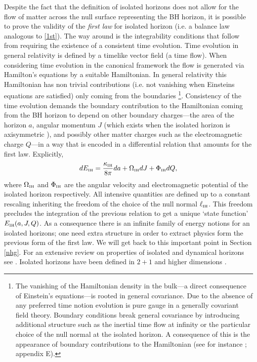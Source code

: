 \documentclass[aps, nofootinbib,superscriptaddress,12pt]{revtex4-2}
\newcommand{\va}{\scriptscriptstyle}
\def\be{\begin{equation}}
\def\ee{\end{equation}}
\begin{document}
Despite the fact that the definition of isolated horizons does not allow for the flow of matter across the null surface representing the BH horizon, it is possible to prove the validity of the {\em first law} for isolated horizon (i.e. a balance law analogous to \eqref{1st}).  The way around is the integrability conditions that follow from requiring the existence of a consistent time evolution.  Time evolution in general relativity is defined by a timelike vector field (a time flow). When considering time evolution in the canonical framework the flow is generated via Hamilton's equations by a suitable Hamiltonian. In general relativity this Hamiltonian has non trivial contributions (i.e. not vanishing when Einsteins equations are satisfied) only coming from the boundaries \footnote{The vanishing of the Hamiltonian density in the bulk---a direct consequence of Einstein's equations---is rooted in general covariance. Due to the absence of any preferred time notion evolution is pure gauge in a generally covariant field theory. Boundary conditions break general covariance by introducing additional structure such as the inertial time flow at infinity or the particular choice of the null normal at the isolated horizon. A consequence of this is the appearance of boundary contributions to the Hamiltonian (see for instance \cite{wald}; appendix E).}. Consistency of the time evolution demands the boundary contribution to the Hamiltonian coming from the BH horizon to depend on other boundary charges---the area of the horizon $a$, angular momentum $J$ (which exists when the isolated horizon is axisymmetric \cite{Ashtekar:2001is}), and possibly other matter charges such as the electromagnetic charge $Q$---in a way that is encoded in a differential relation that amounts for the first law. Explicitly,
\be
dE_{\va \rm IH}=\frac{\kappa_{\rm \va IH} }{8\pi} da+\Omega_{\va \rm IH} dJ+ \Phi_{\va \rm IH} dQ,
\ee
where $\Omega_{\va \rm IH}$ and $\Phi_{\va\rm IH}$ are the angular velocity and electromagnetic potential of the isolated horizon respectively. All intensive quantities are defined up to a constant rescaling inheriting the freedom of the choice of the null normal $\ell_{\rm \va IH}$. This freedom precludes the integration of the previous relation to get a unique `state function' $E_{\va \rm IH}(a,J,Q)$. As a consequence there is an infinite family of energy notions for an isolated horizons; one need extra structure in order to extract physics form the previous form of the first law.  We will get back to this important point in Section \ref{nhg}. For an extensive review on properties of isolated and dynamical horizons see \cite{Ashtekar:2004cn, Ashtekar:2002ag}. Isolated horizons have been defined in $2+1$ \cite{Ashtekar:2002qc} and higher dimensions \cite{Liko:2007th, Bodendorfer:2013jba, Korzynski:2004gr}. 
\end{document}
